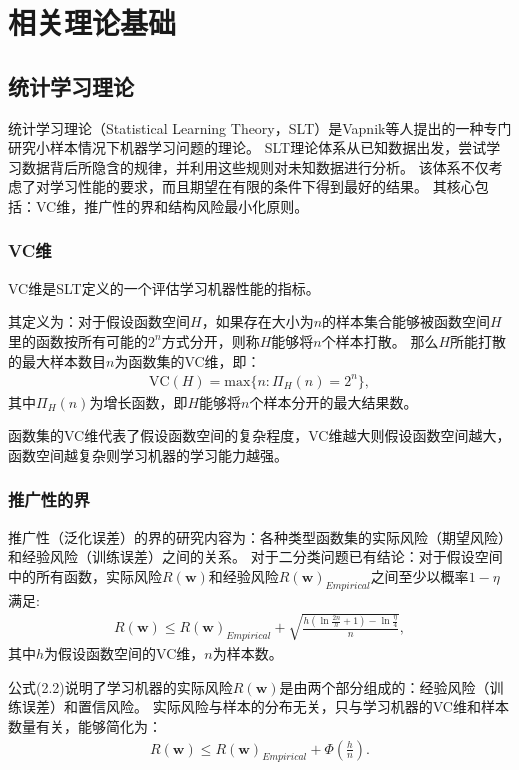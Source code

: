 \chapter{相关理论基础}

\section{统计学习理论}

统计学习理论（Statistical Learning Theory，SLT）是Vapnik等人提出的一种专门研究小样本情况下机器学习问题的理论\cite{vapnik2013nature}。
SLT理论体系从已知数据出发，尝试学习数据背后所隐含的规律，并利用这些规则对未知数据进行分析。
该体系不仅考虑了对学习性能的要求，而且期望在有限的条件下得到最好的结果。
其核心包括：VC维，推广性的界和结构风险最小化原则。

\subsection{VC维}

VC维是SLT定义的一个评估学习机器性能的指标。

其定义为：对于假设函数空间$H$，如果存在大小为$n$的样本集合能够被函数空间$H$里的函数按所有可能的$2^n$方式分开，则称$H$能够将$n$个样本打散。
那么$H$所能打散的最大样本数目$n$为函数集的VC维，即：
\begin{align}
    \mathrm{VC}(H)=\mathrm{max}\{n:\Pi_H(n)=2^n\},
\end{align}
其中$\Pi_H(n)$为增长函数，即$H$能够将$n$个样本分开的最大结果数。

函数集的VC维代表了假设函数空间的复杂程度，VC维越大则假设函数空间越大，函数空间越复杂则学习机器的学习能力越强。

\subsection{推广性的界}

推广性（泛化误差）的界的研究内容为：各种类型函数集的实际风险（期望风险）和经验风险（训练误差）之间的关系。
对于二分类问题已有结论：对于假设空间中的所有函数，实际风险$R(\mathbf{w})$和经验风险$R(\mathbf{w})_{Empirical}$之间至少以概率$1-\eta$满足:
\begin{align}
    R(\mathbf{w})\leq R(\mathbf{w})_{Empirical} + \sqrt{\frac{h(\ln{\frac{2n}{h}+1}) - \ln{\frac{\eta}{4}}}{n}},
\end{align}
其中$h$为假设函数空间的VC维，$n$为样本数。

公式(2.2)说明了学习机器的实际风险$R(\mathbf{w})$是由两个部分组成的：经验风险（训练误差）和置信风险。
实际风险与样本的分布无关，只与学习机器的VC维和样本数量有关，能够简化为：
\begin{align}
    R(\mathbf{w})\leq R(\mathbf{w})_{Empirical} + \Phi(\frac{h}{n}).
\end{align}

